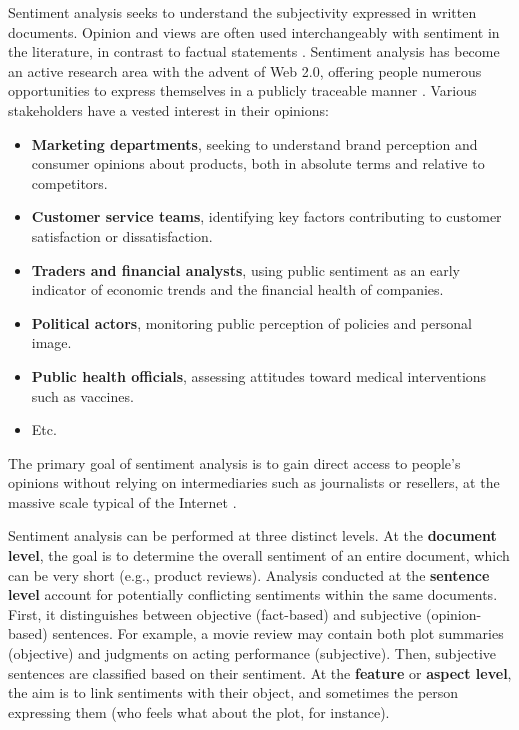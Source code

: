 \documentclass{article}
\begin{document}
Sentiment analysis seeks to understand the subjectivity expressed in written documents. Opinion and views are often used interchangeably with sentiment in the literature, in contrast to factual statements \citep{munezero_are_2014}. Sentiment analysis has become an active research area with the advent of Web 2.0, offering people numerous opportunities to express themselves in a publicly traceable manner \citep{stine_sentiment_2019}. Various stakeholders have a vested interest in their opinions:
\begin{itemize}
    \item \textbf{Marketing departments}, seeking to understand brand perception and consumer opinions about products, both in absolute terms and relative to competitors.
    \item \textbf{Customer service teams}, identifying key factors contributing to customer satisfaction or dissatisfaction.
    \item \textbf{Traders and financial analysts}, using public sentiment as an early indicator of economic trends and the financial health of companies.
    \item \textbf{Political actors}, monitoring public perception of policies and personal image.
    \item \textbf{Public health officials}, assessing attitudes toward medical interventions such as vaccines.
    \item Etc.
\end{itemize}

The primary goal of sentiment analysis is to gain direct access to people's opinions without relying on intermediaries such as journalists or resellers, at the massive scale typical of the Internet \citep{ravi_survey_2015,hemmatian_survey_2019}.

Sentiment analysis can be performed at three distinct levels. At the \textbf{document level}, the goal is to determine the overall sentiment of an entire document, which can be very short (e.g., product reviews). Analysis conducted at the \textbf{sentence level} account for potentially conflicting sentiments within the same documents. First, it distinguishes between objective (fact-based) and subjective (opinion-based) sentences. For example, a movie review may contain both plot summaries (objective) and judgments on acting performance (subjective). Then, subjective sentences are classified based on their sentiment. At the \textbf{feature} or \textbf{aspect level}, the aim is to link sentiments with their object, and sometimes the person expressing them (who feels what about the plot, for instance).
\end{document}
